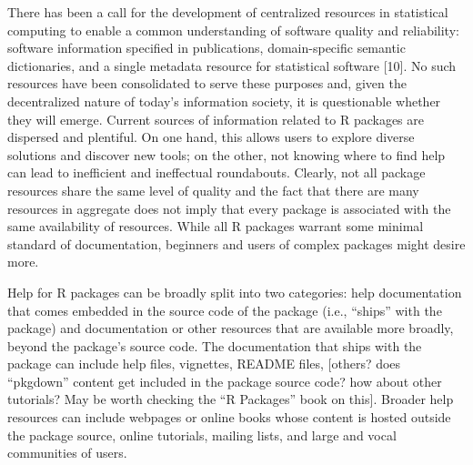 \documentclass[10pt,letterpaper]{article}
\begin{document}
There has been a call for the development of centralized resources in
statistical computing to enable a common understanding of software
quality and reliability: software information specified in publications,
domain-specific semantic dictionaries, and a single metadata resource
for statistical software {[}10{]}. No such resources have been
consolidated to serve these purposes and, given the decentralized nature
of today's information society, it is questionable whether they will
emerge. Current sources of information related to R packages are
dispersed and plentiful. On one hand, this allows users to explore
diverse solutions and discover new tools; on the other, not knowing
where to find help can lead to inefficient and ineffectual roundabouts.
Clearly, not all package resources share the same level of quality and
the fact that there are many resources in aggregate does not imply that
every package is associated with the same availability of resources.
While all R packages warrant some minimal standard of documentation,
beginners and users of complex packages might desire more.

Help for R packages can be broadly split into two categories: help
documentation that comes embedded in the source code of the package
(i.e., ``ships'' with the package) and documentation or other resources
that are available more broadly, beyond the package's source code. The
documentation that ships with the package can include help files,
vignettes, README files, {[}others? does ``pkgdown'' content get
included in the package source code? how about other tutorials? May be
worth checking the ``R Packages'' book on this{]}. Broader help
resources can include webpages or online books whose content is hosted
outside the package source, online tutorials, mailing lists, and large
and vocal communities of users.
\end{document}
